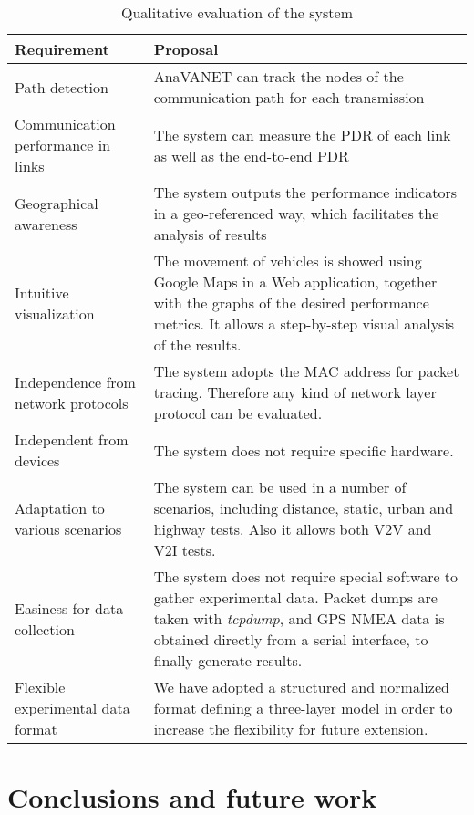 \documentclass[fonts]{icst}
\providecommand{\tabularnewline}{\\}
\begin{document}
\begin{table}
\begin{centering}
\begin{tabular}{|>{\raggedright}p{2.5cm}|>{\raggedright}p{5.2cm}|}
\hline 
\textbf{\small{}Requirement} & \textbf{\small{}Proposal}\tabularnewline
\hline 
\hline 
{\small{}Path detection} & {\small{}AnaVANET can track the nodes of the communication path for
each transmission}\tabularnewline
\hline 
{\small{}Communication performance in links} & {\small{}The system can measure the PDR of each link as well as the
end-to-end PDR}\tabularnewline
\hline 
{\small{}Geographical awareness} & {\small{}The system outputs the performance indicators in a geo-referenced
way, which facilitates the analysis of results}\tabularnewline
\hline 
{\small{}Intuitive visualization} & {\small{}The movement of vehicles is showed using Google Maps in a
Web application, together with the graphs of the desired performance
metrics. It allows a step-by-step visual analysis of the results.}\tabularnewline
\hline 
{\small{}Independence from network protocols} & {\small{}The system adopts the MAC address for packet tracing. Therefore
any kind of network layer protocol can be evaluated.}\tabularnewline
\hline 
{\small{}Independent from devices} & {\small{}The system does not require specific hardware.}\tabularnewline
\hline 
{\small{}Adaptation to various scenarios} & {\small{}The system can be used in a number of scenarios, including
distance, static, urban and highway tests. Also it allows both V2V
and V2I tests.}\tabularnewline
\hline 
{\small{}Easiness for data collection} & {\small{}The system does not require special software to gather experimental
data. Packet dumps are taken with }\emph{\small{}tcpdump}, {\small{}
and GPS NMEA data is obtained directly from a serial interface, to
finally generate results.}\tabularnewline
\hline 
{\small{}Flexible experimental data format} & {\small{}We have adopted a structured and normalized format defining
a three-layer model in order to increase the flexibility for future
extension.}\tabularnewline
\hline 
\end{tabular}
\par\end{centering}

\protect\caption{Qualitative evaluation of the system\label{tab:Qualitative-Evaluation}}


\end{table}




\section{Conclusions and future work}
\label{lbl:conclusion}
\end{document}
